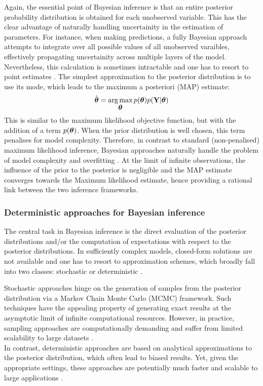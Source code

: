 Again, the essential point of Bayesian inference is that an entire posterior probability distribution is obtained for each unobserved variable. This has the clear advantage of naturally handling uncertainity in the estimation of parameters. For instance, when making predictions, a fully Bayesian approach attempts to integrate over all possible values of all unobserved varaibles, effectively propagating uncertainity across multiple layers of the model. Nevertheless, this calculation is sometimes intractable and one has to resort to point estimates \cite{Bishop2006,Murphy,Gelman2013}. The simplest approximation to the posterior distribution is to use its mode, which leads to the maximum a posteriori (MAP) estimate:
\[
	\hat{\mbox{\boldmath $\theta$}} = \operatorname*{arg\,max}_{\mbox{\boldmath $\theta$}} p(\mbox{\boldmath $\theta$}) p({\bf Y}|\mbox{\boldmath $\theta$}) 
\]
This is similar to the maximum likelihood objective function, but with the addition of a term $p(\mbox{\boldmath $\theta$})$. When the prior distribution is well chosen, this term penalises for model complexity. Therefore, in contrast to standard (non-penalised) maximum likelihood inference, Bayesian approaches naturally handle the problem of model complexity and overfitting \cite{Bishop2006,Murphy,Gelman2013}. At the limit of infinite observations, the influence of the prior to the posterior is negligible and the MAP estimate converges towards the Maximum likelihood estimate, hence providing a rational link between the two inference frameworks.

\subsubsection{Deterministic approaches for Bayesian inference} \label{section:deterministic_bayesian_inference}
The central task in Bayesian inference is the direct evaluation of the posterior distributions and/or the computation of expectations with respect to the posterior distributions. In sufficiently complex models, closed-form solutions are not available and one has to resort to approximation schemes, which broadly fall into two classes: stochastic or deterministic \cite{Gelman2013,Blei2016}. 

Stochastic approaches hinge on the generation of samples from the posterior distribution via a Markov Chain Monte Carlo (MCMC) framework. Such techniques have the appealing property of generating exact results at the asymptotic limit of infinite computational resources. However, in practice, sampling approaches are computationally demanding and suffer from limited scalability to large datasets \cite{Blei2016}. \\
In contrast, deterministic approaches are based on analytical approximations to the posterior distribution, which often lead to biased results. Yet, given the appropriate settings, these approaches are potentially much faster and scalable to large applications \cite{Bishop2006,Murphy,Blei2016}.

